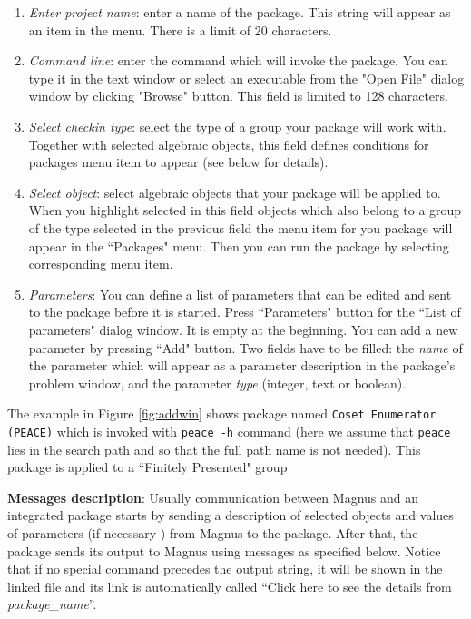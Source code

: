 \documentclass[12pt]{article}
\begin{document}
\begin{enumerate}
\item \emph{Enter project name}: enter a name of the package. This
string will appear as an item in the menu. There is a limit of
20 characters.
\item \emph{Command line}: enter the command which will invoke
the package. You can type it in the text window or select an
executable from the "Open File" dialog window by clicking
"Browse" button. This field is limited to 128 characters.
\item \emph{Select checkin type}: select the type of a group
your package will work with. Together with selected algebraic
objects, this field defines conditions for packages menu item to
appear (see below for details).
\item \emph{Select object}: select algebraic objects
that your package will be applied to. When you  highlight
selected in this field objects which also belong to a group of the
type selected in the previous field the menu item for you package
will appear in the ``Packages" menu. Then you can run the package
by selecting corresponding menu item.
\item \emph{Parameters}: You can define a list of parameters that
can be edited and sent to the package before it is started. Press
``Parameters" button for the ``List of parameters" dialog window. It is
empty at the beginning. You can add a new parameter by pressing
``Add" button. Two fields have to be filled: the {\em name} of the parameter
which will appear as a parameter description in the package's
problem window, and the parameter {\em type} (integer, text or boolean).
\end{enumerate}


The example in Figure \ref{fig:addwin} shows package named 
\verb+Coset Enumerator (PEACE)+ 
which is invoked with \verb+peace -h+ command (here we assume that 
\verb+peace+ lies in the search path and so that the full path name is not 
needed). 
This package is applied to a ``Finitely Presented" group


\textbf{Messages description}: 
Usually communication between Magnus and an integrated package 
starts by sending a description of selected objects and values
of parameters (if necessary )  from Magnus to the package.
After that, the package sends its output to Magnus using messages as
specified below. Notice that if no special command precedes the output
string, it will be shown in the linked file and its link is automatically 
called ``Click here to see the details from \emph{package\_name}''.
\end{document}
